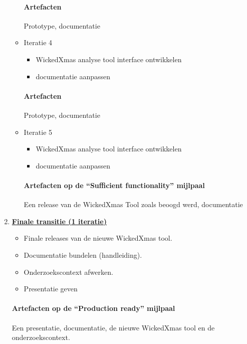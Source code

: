 \begin{enumerate}
\begin{itemize}
		\paragraph{Artefacten}
		Prototype, documentatie
	\item Iteratie 4
		\begin{itemize}
		\item WickedXmas analyse tool interface ontwikkelen
		\item documentatie aanpassen
		\end{itemize}
		\paragraph{Artefacten}
		Prototype, documentatie
	\item Iteratie 5
		\begin{itemize}
		\item WickedXmas analyse tool interface ontwikkelen
		\item documentatie aanpassen
		\end{itemize}
		\paragraph{Artefacten op de ``Sufficient functionality'' mijlpaal }
		 Een release van de WickedXmas Tool zoals beoogd werd,  documentatie
	\end{itemize}

\item \underline{\textbf{Finale transitie (1 iteratie)}}
	\begin{itemize}
		\item Finale releases van de nieuwe WickedXmas tool.
		\item Documentatie bundelen (handleiding).
		\item Onderzoekscontext afwerken.
		\item Presentatie geven
	\end{itemize}
	\paragraph{Artefacten op de ``Production ready'' mijlpaal}
	Een presentatie, documentatie, de nieuwe WickedXmas tool en de onderzoekscontext.

\end{enumerate}